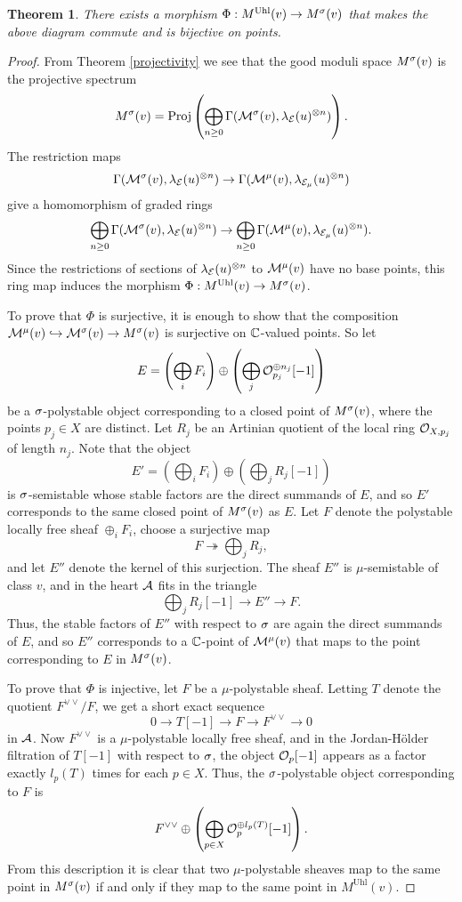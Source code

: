 \documentclass[letterpaper,12pt]{amsart}
\newtheorem{thm}{Theorem}[section]
\theoremstyle{remark}
\begin{document}
\begin{thm}\label{uhlenbeck}
    There exists a morphism $\Phi: M^{\mathrm{Uhl}}(v) \to M^\sigma(v)$ that makes the above diagram commute and is bijective on points.
\end{thm}
\begin{proof}
    From Theorem \ref{projectivity} we see that the good moduli space $M^\sigma(v)$ is the projective spectrum
    \[ M^{\sigma}(v) = \operatorname{\mathrm{Proj}} \left(\bigoplus_{n \ge 0} \Gamma(\mathcal{M}^{\sigma}(v), \lambda_{\mathcal{E}}(u)^{\otimes n}) \right). \]
    The restriction maps
    \[ \Gamma(\mathcal{M}^{\sigma}(v), \lambda_{\mathcal{E}}(u)^{\otimes n}) \to \Gamma(\mathcal{M}^\mu(v), \lambda_{\mathcal{E}_\mu}(u)^{\otimes n}) \]
    give a homomorphism of graded rings
    \[ \bigoplus_{n \ge 0} \Gamma(\mathcal{M}^{\sigma}(v), \lambda_{\mathcal{E}}(u)^{\otimes n}) \to \bigoplus_{n \ge 0} \Gamma(\mathcal{M}^\mu(v), \lambda_{\mathcal{E}_\mu}(u)^{\otimes n}). \]
    Since the restrictions of sections of $\lambda_{\mathcal{E}}(u)^{\otimes n}$ to $\mathcal{M}^\mu(v)$ have no base points, this ring map induces the morphism $\Phi: M^{\mathrm{Uhl}}(v) \to M^\sigma(v)$. 
    
    To prove that $\Phi$ is surjective, it is enough to show that the composition $\mathcal{M}^\mu(v) \hookrightarrow \mathcal{M}^{\sigma}(v) \to M^\sigma(v)$ is surjective on $\mathbb{C}$-valued points. So let 
    \[ E = \left(\bigoplus_i F_i\right) \oplus \left(\bigoplus_j \mathcal{O}_{p_j}^{\oplus n_j}[-1]\right) \]
    be a $\sigma$-polystable object corresponding to a closed point of $M^\sigma(v)$, where the points $p_j \in X$ are distinct. Let $R_j$ be an Artinian quotient of the local ring $\mathcal{O}_{X, p_j}$ of length $n_j$. Note that the object
    \[ E' = \left(\bigoplus_i F_i\right) \oplus \left(\bigoplus_j R_j [-1]\right) \]
    is $\sigma$-semistable whose stable factors are the direct summands of $E$, and so $E'$ corresponds to the same closed point of $M^\sigma(v)$ as $E$. Let $F$ denote the polystable locally free sheaf $\oplus_i F_i$, choose a surjective map
    \[ F \twoheadrightarrow \bigoplus_j R_j, \]
    and let $E''$ denote the kernel of this surjection. The sheaf $E''$ is $\mu$-semistable of class $v$, and in the heart $\mathcal{A}$ fits in the triangle
    \[ \bigoplus_j R_j[-1] \to E'' \to F. \]
    Thus, the stable factors of $E''$ with respect to $\sigma$ are again the direct summands of $E$, and so $E''$ corresponds to a $\mathbb{C}$-point of $\mathcal{M}^\mu(v)$ that maps to the point corresponding to $E$ in $M^\sigma(v)$.
    
    To prove that $\Phi$ is injective, let $F$ be a $\mu$-polystable sheaf. Letting $T$ denote the quotient $F^{\vee\vee}/F$, we get a short exact sequence
    \[ 0 \to T[-1] \to F \to F^{\vee\vee} \to 0 \]
    in $\mathcal{A}$. Now $F^{\vee\vee}$ is a $\mu$-polystable locally free sheaf, and in the Jordan-H\"older filtration of $T[-1]$ with respect to $\sigma$, the object $\mathcal{O}_p[-1]$ appears as a factor exactly $l_p(T)$ times for each $p \in X$. Thus, the $\sigma$-polystable object corresponding to $F$ is
    \[ F^{\vee\vee} \oplus \left(\bigoplus_{p \in X} \mathcal{O}_p^{\oplus l_p(T)}[-1] \right). \]
    From this description it is clear that two $\mu$-polystable sheaves map to the same point in $M^\sigma(v)$ if and only if they map to the same point in $M^{\mathrm{Uhl}}(v)$.
\end{proof} 




\end{document}
